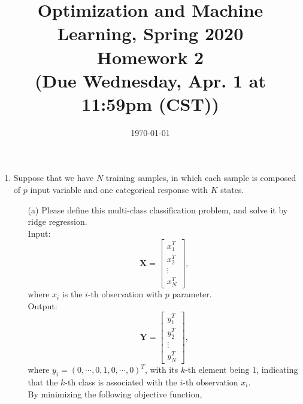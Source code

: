 \documentclass[10pt]{article}
\begin{document}
\date{\today}
\title{Optimization and Machine Learning, Spring 2020 \\
    Homework 2\\
    \small (Due Wednesday, Apr. 1 at 11:59pm (CST))}
\maketitle
\begin{enumerate}[1.]


    \item Suppose that we have $N$ training samples, in which each sample is composed of $p$ input variable and one categorical response with $K$ states.
          \begin{itemize}
              \item[(a)] Please define this multi-class classification problem, and solve it by ridge regression. ~\\
                    {\color{blue}
                    Input:\begin{equation*}
                        \mathbf{X} = \begin{bmatrix}
                            x_1^T  \\
                            x_2^T  \\
                            \vdots \\
                            x_N^T
                        \end{bmatrix},
                    \end{equation*}
                    where $x_i$ is the $i$-th observation with $p$ parameter.\\
                    Output:\begin{equation*}
                        \mathbf{Y} = \begin{bmatrix}
                            y_1^T  \\
                            y_2^T  \\
                            \vdots \\
                            y_N^T
                        \end{bmatrix},
                    \end{equation*}
                    where $y_i = (0,\cdots,0,1,0,\cdots,0)^T$, with its $k$-th element being 1, 
                    indicating that the $k$-th class is associated with the $i$-th observation $x_i$.\\
                    By minimizing the following objective function,
}
\end{itemize}
\end{enumerate}
\end{document}
